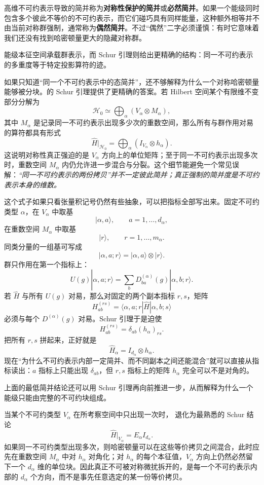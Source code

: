 高维不可约表示导致的简并称为\textbf{对称性保护的简并}或\textbf{必然简并}。如果一个能级同时包含多个彼此不等价的不可约表示，而它们碰巧具有同样能量，这种额外相等并不由当前对称群强制，通常称为\textbf{偶然简并}。不过“偶然”二字必须谨慎：有时它意味着我们还没有找到哈密顿量更大的隐藏对称群。

能级本征空间承载群表示，而 Schur 引理则给出更精确的结构：同一不可约表示的多重度等于特定投影算符的迹。

如果只知道“同一个不可约表示中的态简并”，还不够解释为什么一个对称哈密顿量能够被分块。的 Schur 引理提供了更精确的答案。若 Hilbert 空间某个有限维不变部分分解为
\[
\mathcal H_0\simeq\bigoplus_\alpha
\left(V_\alpha\otimes M_\alpha\right),
\]
其中 $M_\alpha$ 是记录同一不可约表示出现多少次的重数空间，那么所有与群作用对易的算符都具有形式
\begin{equation}
\hat H\big|_{\mathcal H_0}
=\bigoplus_\alpha
\left(I_{V_\alpha}\otimes h_\alpha\right).
\label{eq:commutant-block-form}
\end{equation}
这说明对称性真正强迫的是 $V_\alpha$ 方向上的单位矩阵；至于同一不可约表示出现多次时，重数空间 $M_\alpha$ 内仍允许进一步混合与分裂。这个细节能避免一个常见误解：\emph{“同一不可约表示的两份拷贝”并不一定彼此简并；真正强制的简并度是不可约表示本身的维数。}

这个式子如果只看张量积记号仍然有些抽象，可以把指标全部写出来。固定不可约类型 $\alpha$，在 $V_\alpha$ 中取基
\[
|\alpha,a\rangle,\qquad a=1,\dots,d_\alpha,
\]
在重数空间 $M_\alpha$ 中取基
\[
|r\rangle,\qquad r=1,\dots,m_\alpha.
\]
同类分量的一组基可写成
\[
|\alpha,a;r\rangle=|\alpha,a\rangle\otimes|r\rangle.
\]
群只作用在第一个指标上：
\[
U(g)|\alpha,a;r\rangle
=\sum_bD^{(\alpha)}_{ba}(g)|\alpha,b;r\rangle.
\]
若 $\hat H$ 与所有 $U(g)$ 对易，那么对固定的两个副本指标 $r,s$，矩阵
\[
H^{(rs)}_{ab}
=\langle\alpha,a;r|\hat H|\alpha,b;s\rangle
\]
必须与每个 $D^{(\alpha)}(g)$ 对易。Schur 引理于是迫使
\[
H^{(rs)}_{ab}=\delta_{ab}(h_\alpha)_{rs}.
\]
把所有 $r,s$ 拼起来，正好就是
\[
\hat H_\alpha=I_{d_\alpha}\otimes h_\alpha.
\]
现在“为什么不可约表示内部一定简并、而不同副本之间还能混合”就可以直接从指标读出：$a$ 指标上只能出现 $\delta_{ab}$，但 $r,s$ 指标上的矩阵 $h_\alpha$ 完全可以不是对角的。

上面的最低简并结论还可以用 Schur 引理再向前推进一步，从而解释为什么一个能级只能由完整的不可约块组成。

当某个不可约类型 $V_\alpha$ 在所考察空间中只出现一次时， 退化为最熟悉的 Schur 结论
\begin{equation}
\hat H\big|_{V_\alpha}=E_\alpha I_{d_\alpha}.
\label{eq:H-scalar-on-irrep}
\end{equation}
如果同一不可约类型出现多次，则哈密顿量可以在这些等价拷贝之间混合，此时应先在重数空间 $M_\alpha$ 中对 $h_\alpha$ 对角化；对 $h_\alpha$ 的每个本征值，$V_\alpha$ 方向上仍然必然留下一个 $d_\alpha$ 维的单位块。因此真正不可被对称微扰拆开的，是每一个不可约表示内部的 $d_\alpha$ 个方向，而不是事先任意选定的某一份等价拷贝。

